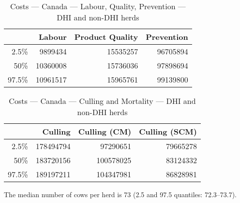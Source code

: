 \documentclass{article}\usepackage[]{graphicx}\usepackage[]{color}
\begin{document}
\begin{table}[ht]
\centering
\begin{tabular}{rrrr}
  \hline
 & Labour & Product Quality & Prevention \\ 
  \hline
2.5\% & 9899434 & 15535257 & 96705894 \\ 
  50\% & 10360008 & 15736036 & 97898694 \\ 
  97.5\% & 10961517 & 15965761 & 99139800 \\ 
   \hline
\end{tabular}
\caption{Costs --- Canada --- Labour, Quality, Prevention --- DHI and non-DHI herds} 
\label{tab:canada2:b}
\end{table}
\begin{table}[ht]
\centering
\begin{tabular}{rrrr}
  \hline
 & Culling & Culling (CM) & Culling (SCM) \\ 
  \hline
2.5\% & 178494794 & 97290651 & 79665278 \\ 
  50\% & 183720156 & 100578025 & 83124332 \\ 
  97.5\% & 189197211 & 104347981 & 86828981 \\ 
   \hline
\end{tabular}
\caption{Costs --- Canada --- Culling and Mortality --- DHI and non-DHI herds} 
\label{tab:canada2:c}
\end{table}


The median number of cows per herd is 73 (2.5
and 97.5 quantiles: 72.3--73.7).
\clearpage
\end{document}
